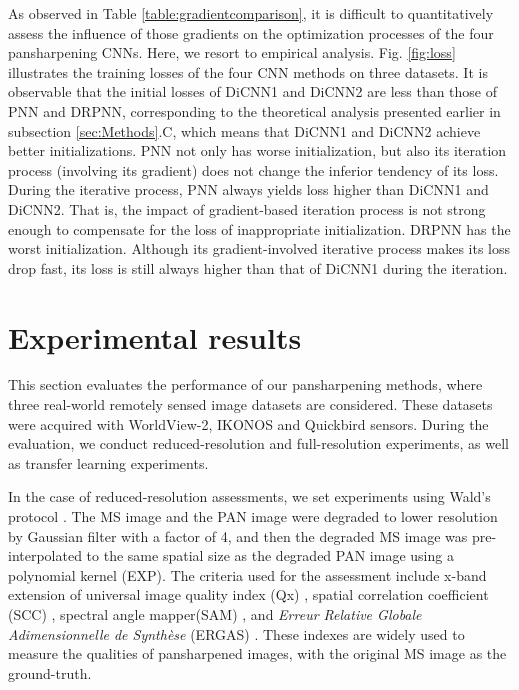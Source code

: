 \documentclass[journal]{IEEEtran}
\begin{document}
As observed in Table \ref{table:gradientcomparison}, it is difficult to quantitatively assess the influence of those gradients on the optimization processes of the four pansharpening CNNs. Here, we resort to empirical analysis. Fig. \ref{fig:loss} illustrates the training losses of the four CNN methods on three datasets. It is observable that the initial losses of DiCNN1 and DiCNN2 are less than those of PNN and DRPNN, corresponding to the theoretical analysis presented earlier in subsection \ref{sec:Methods}.C, which means that DiCNN1 and DiCNN2 achieve better initializations. PNN not only has worse initialization, but also its iteration process (involving its gradient) does not change the inferior tendency of its loss. During the iterative process, PNN always yields loss higher than DiCNN1 and DiCNN2. That is, the impact of gradient-based iteration process is not strong enough to compensate for the loss of inappropriate initialization. DRPNN has the worst initialization. Although its gradient-involved iterative process makes its loss drop fast, its loss is still always higher than that of DiCNN1 during the iteration.


\section{Experimental results}\label{sec:ExperiResults}
This section evaluates the performance of our pansharpening methods, where three real-world remotely sensed image datasets are considered. These datasets were acquired with WorldView-2, IKONOS and Quickbird sensors. During the evaluation, we conduct reduced-resolution and full-resolution experiments, as well as transfer learning experiments.

In the case of reduced-resolution assessments, we set experiments using Wald's protocol \cite{Wald:Wald1997}. The MS image and the PAN image were degraded to lower resolution by Gaussian filter with a factor of 4\cite{Alparone2006MTF}, and then the degraded MS image was pre-interpolated to the same spatial size as the degraded PAN image using a polynomial kernel (EXP)\cite{EXP:Aiazzi2002}.
The criteria used for the assessment include x-band extension of universal image quality index (Qx) \cite{Alparone2004A}, spatial correlation coefficient (SCC) \cite{J1998A}, spectral angle mapper(SAM) \cite{Yuhas1992Descrimination}, and \emph{Erreur Relative Globale Adimensionnelle de Synth\`{e}se} (ERGAS) \cite{Wald2002Data}. These indexes are widely used to measure the qualities of pansharpened images, with the original MS image as the ground-truth.
\end{document}

